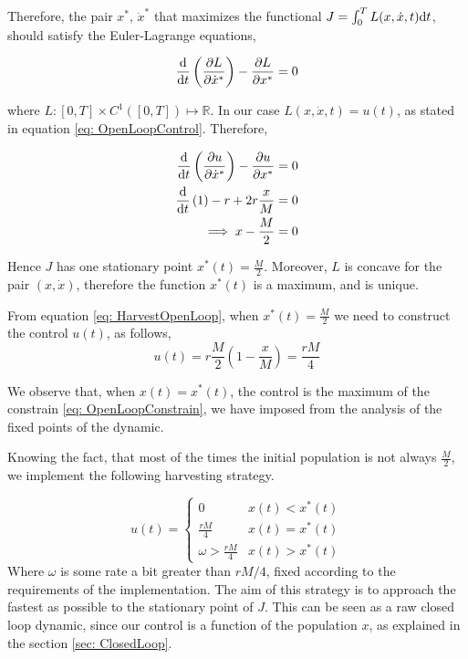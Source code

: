 Therefore, the pair $x^*$, $\dot{x}^*$ that maximizes the functional $J=\int_0^T L(x, \dot{x}, t)\mathrm{d} t$, should satisfy the Euler-Lagrange equations,

\begin{equation}
	\frac{\mathrm{d} }{{\mathrm{d} t}}\left(\frac{\partial L}{{\partial \dot{x}^*}}\right)-\frac{\partial L}{{\partial x^*}}=0 \label{eq: Euler-Lagrange}
\end{equation}

where $L:[0,T]\times C^1([0,T]) \mapsto \mathbb{R}$. In our case $L(x,\dot{x}, t)=u(t)$, as stated in equation \ref{eq: OpenLoopControl}. Therefore,

\begin{align}
	\frac{\mathrm{d} }{{\mathrm{d} t}}\left(\frac{\partial u}{{\partial \dot{x}^*}}\right)-\frac{\partial u}{{\partial x^*}}&=0 \nonumber\\ \frac{\mathrm{d} }{{\mathrm{d} t}}\left(1\right)-r+2r\frac{x}{M}&=0 \nonumber\\
	\implies x- \frac{M}{2}&=0
\end{align}

Hence $J$ has one stationary point $x^*(t)=\frac{M}{2}$. Moreover, $L$ is concave for the pair $(x, \dot{x})$, therefore the function $x^*(t)$ is a maximum, and is unique. 

From equation \ref{eq: HarvestOpenLoop}, when $x^*(t)=\frac{M}{2}$ we need to construct the control $u(t)$, as follows,
\begin{equation}
	u(t)=r\frac{M}{2}\left(1-\frac{x}{M}\right)=\frac{rM}{4}
\end{equation}

We observe that, when $x(t)=x^*(t)$, the control is the maximum of the constrain \ref{eq: OpenLoopConstrain}, we have imposed from the analysis of the fixed points of the dynamic. 

Knowing the fact, that most of the times the initial population is not always $\frac{M}{2}$, we implement the following harvesting strategy.

\begin{equation}
	u(t)=\begin{cases}
	0 & x(t)<x^*(t) \\
	\frac{rM}{4} & x(t)=x^*(t) \\
	\omega>\frac{rM}{4} & x(t)>x^*(t)
	\end{cases}
\end{equation}
Where $\omega$ is some rate a bit greater than $rM/4$, fixed according to the requirements of the implementation. The aim of this strategy is to approach the fastest as possible to the stationary point of $J$. This can be seen as a raw closed loop dynamic, since our control is a function of the population $x$, as explained in the section \ref{sec: ClosedLoop}.

